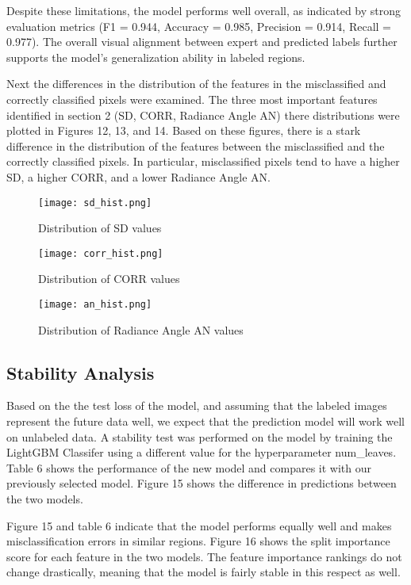 \documentclass[11pt,letterpaper]{article}
\begin{document}
Despite these limitations, the model performs well overall, as indicated by strong evaluation metrics (F1 = 0.944, Accuracy = 0.985, Precision = 0.914, Recall = 0.977). The overall visual alignment between expert and predicted labels further supports the model's generalization ability in labeled regions. 

Next the differences in the distribution of the features in the misclassified and correctly classified pixels were examined. The three most important features identified in section 2 (SD, CORR, Radiance Angle AN) there distributions were plotted in Figures 12, 13, and 14. Based on these figures, there is a stark difference in the distribution of the features between the misclassified and the correctly classified pixels. In particular, misclassified pixels tend to have a higher SD, a higher CORR, and a lower Radiance Angle AN.

\begin{figure}[H]
    \centering
    \texttt{[image: sd\_hist.png]}
    \caption{Distribution of SD values}
    \label{fig:enter-label}
\end{figure}

\begin{figure}[H]
    \centering
    \texttt{[image: corr\_hist.png]}
    \caption{Distribution of CORR values}
    \label{fig:enter-label}
\end{figure}

\begin{figure}[H]
    \centering
    \texttt{[image: an\_hist.png]}
    \caption{Distribution of Radiance Angle AN values}
    \label{fig:enter-label}
\end{figure}

\subsection{Stability Analysis}
Based on the the test loss of the model, and assuming that the labeled images represent the future data well, we expect that the prediction model will work well on unlabeled data. A stability test was performed on the model by training the LightGBM Classifer using a different value for the hyperparameter num\_leaves. Table  6 shows the performance of the new model and compares it with our previously selected model. Figure 15 shows the difference in predictions between the two models. 

Figure 15 and table 6 indicate that the model performs equally well and makes misclassification errors in similar regions. Figure 16 shows the split importance score for each feature in the two models. The feature importance rankings do not change drastically, meaning that the model is fairly stable in this respect as well. 
\end{document}
